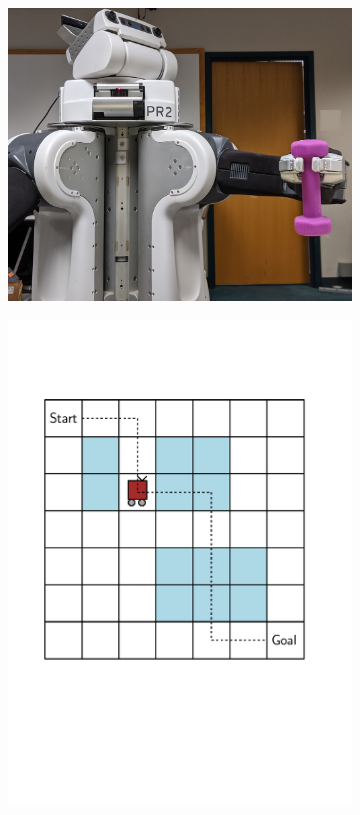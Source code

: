 \begin{figure}[t]
  \centering
  \begin{subfigure}{.5\columnwidth}
    \includegraphics[width=\linewidth]{figures/cmax/pr2_dumbbell_full.jpg}
  \end{subfigure}
  \begin{subfigure}{.4\columnwidth}
    \includegraphics[width=\linewidth]{figures/cmax/gridworld_ice.pdf}

\end{subfigure}
\end{figure}

